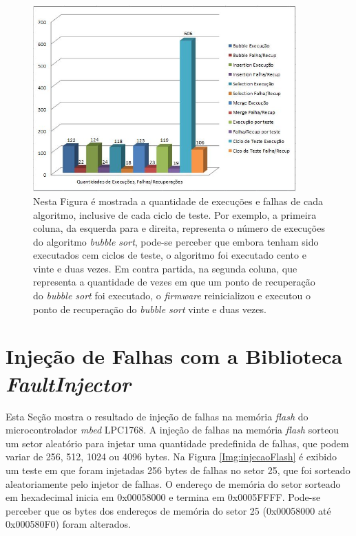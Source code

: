 \begin{figure}[h]
	\centering
	\includegraphics[width=0.9\textwidth]{figuras/testeFaultRecovery.jpg}
	\caption[Resultados Obtidos da Biblioteca \textit{FaultRecovery}]{Nesta Figura é mostrada a quantidade de execuções e falhas de cada algoritmo, inclusive de cada ciclo de teste. Por exemplo, a primeira coluna, da esquerda para e direita, representa o número de execuções do algoritmo \textit{bubble sort}, pode-se perceber que embora tenham sido executados cem ciclos de teste, o algoritmo foi executado cento e vinte e duas vezes. Em contra partida, na segunda coluna, que representa a quantidade de vezes em que um ponto de recuperação do \textit{bubble sort} foi executado, o \textit{firmware} reinicializou e executou o ponto de recuperação do \textit{bubble sort} vinte e duas vezes.}
	\label{Img:testeFaultRecovery}	
\end{figure}

\newpage
\section{Injeção de Falhas com a Biblioteca \textit{FaultInjector}}

Esta Seção mostra o resultado de injeção de falhas na memória \textit{flash} do microcontrolador \textit{mbed} LPC1768. A injeção de falhas na memória \textit{flash} sorteou um setor aleatório para injetar uma quantidade predefinida de falhas, que podem variar de 256, 512, 1024 ou 4096 bytes. Na Figura \ref{Img:injecaoFlash} é exibido um teste em que foram injetadas 256 bytes de falhas no setor 25, que foi sorteado aleatoriamente pelo injetor de falhas. O endereço de memória do setor sorteado em hexadecimal inicia em 0x00058000 e termina em 0x0005FFFF. Pode-se perceber que os bytes dos endereços de memória do setor 25 (0x00058000 até 0x000580F0) foram alterados.


